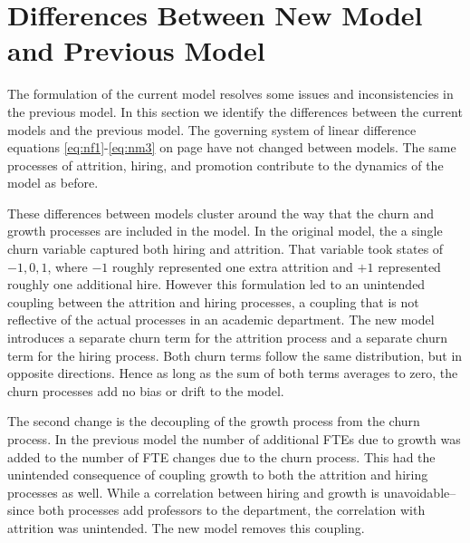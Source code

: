 \documentclass[12pt, a4paper, oneside, headinclude, footinclude,english]{article}
\begin{document}
\section{Differences Between New Model and Previous Model}
\label{sec:differences}

The formulation of the current model resolves some issues and inconsistencies in
the previous model. In this section we identify the differences between the
current models and the previous model. The governing system of linear difference
equations \ref{eq:nf1}-\ref{eq:nm3} on page \pageref{eq:nf1} have not changed
between models. The same processes of attrition, hiring, and promotion
contribute to the dynamics of the model as before.

These differences between models cluster around the way that the churn and
growth processes are included in the model. In the original model, the a single
churn variable captured both hiring and attrition. That variable took states of
$-1, 0, 1$, where $-1$ roughly represented one extra attrition and $+1$
represented roughly one additional hire. However this formulation led to an unintended
coupling between the attrition and hiring processes, a coupling that is not
reflective of the actual processes in an academic department. The new model
introduces a separate churn term for the attrition process and a separate churn
term for the hiring process. Both churn terms follow the same distribution, but
in opposite directions. Hence as long as the sum of both terms averages to zero,
the churn processes add no bias or drift to the model.

The second change is the decoupling of the growth process from the churn
process. In the previous model the number of additional FTEs due to growth was
added to the number of FTE changes due to the churn process. This had the
unintended consequence of coupling growth to both the attrition and hiring
processes as well. While a correlation between hiring and growth is
unavoidable--since both processes add professors to the department, the
correlation with attrition was unintended. The new model removes this coupling. 




\renewcommand{\refname}{\spacedlowsmallcaps{References}} 





\end{document}
